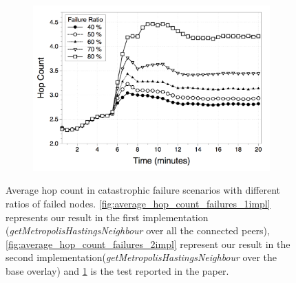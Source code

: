 \begin{figure}
\begin{subfigure}{.5\textwidth}
  \centering
  \includegraphics[keepaspectratio=true, width=1\linewidth]{images/paper_average_hop_count_failures}
  \caption{}
  \label{fig:paper_average_hop_count_failures}
\end{subfigure}
\caption{Average hop count in catastrophic failure scenarios with different ratios of failed nodes.  \ref{fig:average_hop_count_failures_1impl} represents our result in the first implementation (\textit{getMetropolisHastingsNeighbour} over all the connected peers), \ref{fig:average_hop_count_failures_2impl} represent our result in the second implementation(\textit{getMetropolisHastingsNeighbour} over the base overlay) and \ref{fig:paper_average_hop_count_failures} is the test reported in the paper.}
\label{fig:robustness_hop_count_failures}
\end{figure}



